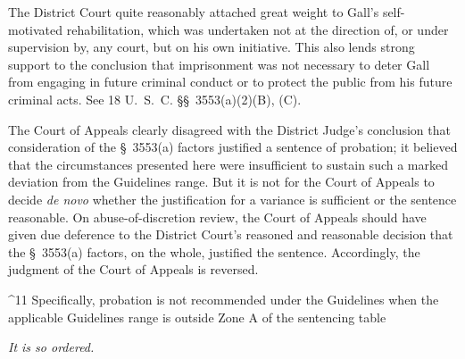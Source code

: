   The District Court quite reasonably attached great weight to Gall's
self-motivated rehabilitation, which was undertaken not at the direction
of, or under supervision by, any court, but on his own initiative. This
also lends strong support to the conclusion that imprisonment was not
necessary to deter Gall from engaging in future criminal conduct or to
protect the public from his future criminal acts. See 18 U.~S.~C.
\S\S~3553(a)(2)(B), (C).

  The Court of Appeals clearly disagreed with the District Judge's
conclusion that consideration of the \S~3553(a) factors justified a
sentence of probation; it believed that the circumstances presented
here were insufficient to sustain such a marked deviation from the
Guidelines range. But it is not for the Court of Appeals to decide \emph{de
novo} whether the justification for a variance is sufficient or the
sentence reasonable. On abuse-of-discretion review, the Court of Appeals
should have given due deference to the District Court's reasoned
\newpage  and reasonable decision that the \S~3553(a) factors, on the
whole, justified the sentence. Accordingly, the judgment of the Court of
Appeals is reversed.


^11 Specifically, probation is not recommended under the Guidelines when
the applicable Guidelines range is outside Zone A of the sentencing
table \newpage 


\begin{flushright}\emph{It is so ordered.}\end{flushright}
